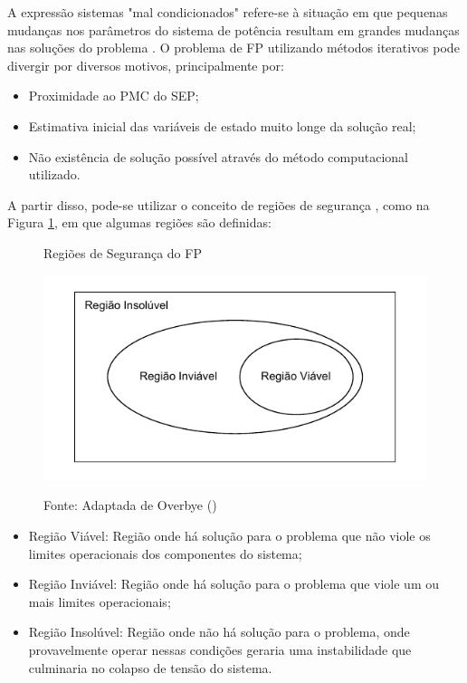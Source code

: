 A expressão sistemas "mal condicionados" refere-se à situação em que pequenas mudanças nos parâmetros do sistema de potência resultam em grandes mudanças nas soluções do problema \cite{11busSystem}. O problema de \ac{FP} utilizando métodos iterativos pode divergir por diversos motivos, principalmente por:
\begin{itemize}
    \item Proximidade ao \ac{PMC} do \ac{SEP};
    \item Estimativa inicial das variáveis de estado muito longe da solução real;
    \item Não existência de solução possível através do método computacional utilizado.
\end{itemize}

A partir disso, pode-se utilizar o conceito de regiões de segurança \cite{Overbye}, como na Figura \ref{fig:regiões de solução}, em que algumas regiões são definidas:

\begin{figure}[htpb!]
    \centering
    \caption{Regiões de Segurança do \ac{FP}}
    \includegraphics[scale=1.7]{textuais/capitulo1/figuras/regioes_seguranca.pdf}
    \label{fig:regiões de solução}
    \caption*{Fonte: Adaptada de Overbye (\citeyear{Overbye})}
\end{figure}


\begin{itemize}
    \item Região Viável: Região onde há solução para o problema que não viole os limites operacionais dos componentes do sistema;
    \item Região Inviável: Região onde há solução para o problema que viole um ou mais limites operacionais;
    \item Região Insolúvel: Região onde não há solução para o problema, onde provavelmente operar nessas condições geraria uma instabilidade que culminaria no colapso de tensão do sistema.
\end{itemize}

